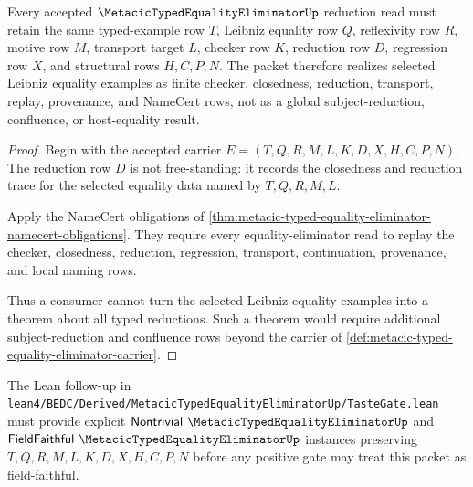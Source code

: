 \begin{theorem}
\label{thm:metacic-typed-equality-eliminator-reduction-boundary}
Every accepted $\MetacicTypedEqualityEliminatorUp$ reduction read must retain the same typed-example row $T$, Leibniz equality row $Q$, reflexivity row $R$, motive row $M$, transport target $L$, checker row $K$, reduction row $D$, regression row $X$, and structural rows $H,C,P,N$. The packet therefore realizes selected Leibniz equality examples as finite checker, closedness, reduction, transport, replay, provenance, and NameCert rows, not as a global subject-reduction, confluence, or host-equality result.
\end{theorem}
\begin{proof}
Begin with the accepted carrier $E=(T,Q,R,M,L,K,D,X,H,C,P,N)$. The reduction row $D$ is not free-standing: it records the closedness and reduction trace for the selected equality data named by $T,Q,R,M,L$.

Apply the NameCert obligations of \autoref{thm:metacic-typed-equality-eliminator-namecert-obligations}. They require every equality-eliminator read to replay the checker, closedness, reduction, regression, transport, continuation, provenance, and local naming rows.

Thus a consumer cannot turn the selected Leibniz equality examples into a theorem about all typed reductions. Such a theorem would require additional subject-reduction and confluence rows beyond the carrier of \autoref{def:metacic-typed-equality-eliminator-carrier}.
\end{proof}



The Lean follow-up in \texttt{lean4/BEDC/Derived/MetacicTypedEqualityEliminatorUp/TasteGate.lean} must provide explicit $\mathsf{Nontrivial}\ \MetacicTypedEqualityEliminatorUp$ and $\mathsf{FieldFaithful}\ \MetacicTypedEqualityEliminatorUp$ instances preserving $T,Q,R,M,L,K,D,X,H,C,P,N$ before any positive gate may treat this packet as field-faithful.

